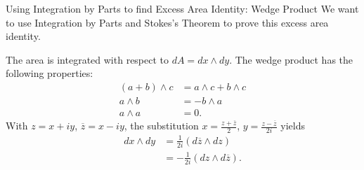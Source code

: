 \documentclass{reu_beamer}
\begin{document}
\begin{frame}[allowframebreaks]{Using Integration by Parts to find Excess Area Identity: Wedge Product}
  We want to use Integration by Parts and Stokes's Theorem to prove this excess area identity.\newline

  The area is integrated with respect to $dA = dx \wedge dy$. The wedge product has the following properties:
  \begin{align*}
    \left(a+b\right)\wedge c &= a\wedge c + b\wedge c\\
    a\wedge b &= -b\wedge a\\
    a\wedge a &= 0.
  \end{align*}
  With $z = x + iy$, $\overline{z} = x-iy$, the substitution $x = \frac{z + \overline{z}}{2}$, $y = \frac{z - \overline{z}}{2i}$ yields
  \begin{align*}
    dx\wedge dy &= \frac{1}{2i}\left(d\overline{z}\wedge dz\right)\\
                &= -\frac{1}{2i}\left(dz \wedge d\overline{z}\right).
  \end{align*}
\end{frame}
\end{document}
